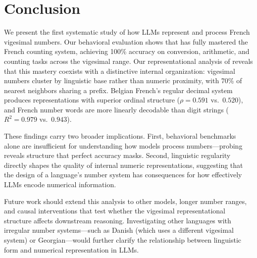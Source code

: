 \section{Conclusion}
\label{sec:conclusion}

We present the first systematic study of how LLMs represent and process French vigesimal numbers.
Our behavioral evaluation shows that \gptmodel has fully mastered the French counting system, achieving 100\% accuracy on conversion, arithmetic, and counting tasks across the vigesimal range.
Our representational analysis of \mistral reveals that this mastery coexists with a distinctive internal organization: vigesimal numbers cluster by linguistic base rather than numeric proximity, with 70\% of nearest neighbors sharing a prefix.
Belgian French's regular decimal system produces representations with superior ordinal structure ($\rho = 0.591$ vs.\ $0.520$), and French number words are more linearly decodable than digit strings ($R^2 = 0.979$ vs.\ $0.943$).

These findings carry two broader implications.
First, behavioral benchmarks alone are insufficient for understanding how models process numbers---probing reveals structure that perfect accuracy masks.
Second, linguistic regularity directly shapes the quality of internal numeric representations, suggesting that the design of a language's number system has consequences for how effectively LLMs encode numerical information.

Future work should extend this analysis to other models, longer number ranges, and causal interventions that test whether the vigesimal representational structure affects downstream reasoning.
Investigating other languages with irregular number systems---such as Danish (which uses a different vigesimal system) or Georgian---would further clarify the relationship between linguistic form and numerical representation in LLMs.
